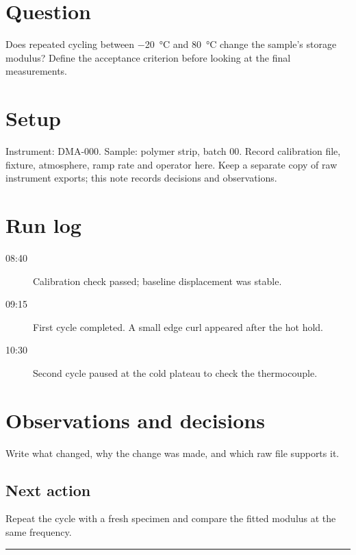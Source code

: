 \documentclass[11pt,a4paper]{whatsnote}
\begin{document}
\maketitle
\section{Question}
Does repeated cycling between \SI{-20}{\celsius} and \SI{80}{\celsius} change
the sample's storage modulus? Define the acceptance criterion before looking
at the final measurements.
\section{Setup}
Instrument: DMA-000. Sample: polymer strip, batch 00. Record calibration file,
fixture, atmosphere, ramp rate and operator here. Keep a separate copy of raw
instrument exports; this note records decisions and observations.
\section{Run log}
\begin{description}
\item[08:40] Calibration check passed; baseline displacement was stable.
\item[09:15] First cycle completed. A small edge curl appeared after the hot hold.
\item[10:30] Second cycle paused at the cold plateau to check the thermocouple.
\end{description}
\section{Observations and decisions}
Write what changed, why the change was made, and which raw file supports it.
\subsection*{Next action}
Repeat the cycle with a fresh specimen and compare the fitted modulus at the
same frequency.\\[2em]
\noindent\rule{\linewidth}{0.4pt}
\end{document}
